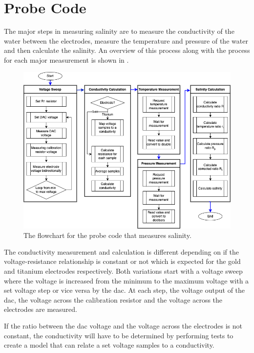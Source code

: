 \section{Probe Code}

The major steps in measuring salinity are to measure the conductivity of the water between the electrodes, measure the temperature and pressure of the water and then calculate the salinity.
An overview of this process along with the process for each major measurement is shown in .

\begin{figure}[h]
    \centering
    \includegraphics[width=1\textwidth]{Figures/probe_flowchart}
    \caption{The flowchart for the probe code that measures salinity.}
    \label{fig:probe-code-flowchart} %
\end{figure}

The conductivity measurement and calculation is different depending on if the voltage-resistance relationship is constant or not which is expected for the gold and titanium electrodes respectively.
Both variations start with a voltage sweep where the voltage is increased from the minimum to the maximum voltage with a set voltage step or vice versa by the \gls{dac}.
At each step, the voltage output of the \gls{dac}, the voltage across the calibration resistor and the voltage across the electrodes are measured.

If the ratio between the \gls{dac} voltage and the voltage across the electrodes is not constant, the conductivity will have to be determined by performing tests to create a model that can relate a set voltage samples to a conductivity. 

